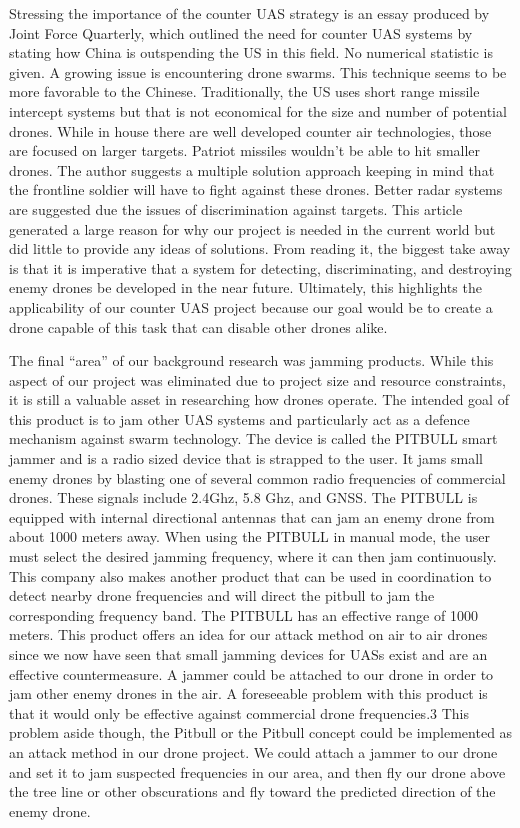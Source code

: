 \documentclass[10pt]{article}
\begin{document}
Stressing the importance of the counter UAS strategy is an essay produced by Joint Force Quarterly, which outlined the need for counter UAS systems by stating how China is outspending the US in this field. No numerical statistic is given. A growing issue is encountering drone swarms. This technique seems to be more favorable to the Chinese. Traditionally, the US  uses short range missile intercept systems but that is not economical for the size and number of potential drones. While in house there are well developed counter air technologies, those are focused on larger targets. Patriot missiles wouldn’t be able to hit smaller drones. The author suggests a multiple solution approach keeping in mind that the frontline soldier will have to fight against these drones. Better radar systems are suggested due the issues of discrimination against targets. This article generated a large reason for why our project is needed in the current world but did little to provide any ideas of solutions. From reading it, the biggest take away is that it is imperative that a system for detecting, discriminating, and destroying enemy drones be developed in the near future.  Ultimately, this highlights the applicability  of our counter UAS project because our goal would be to create a drone capable of this task that can disable other drones alike.  

The final ``area'' of our background research was jamming products. While this aspect of our project was eliminated due to project size and resource constraints, it is still a valuable asset in researching how drones operate.  The intended goal of this product is to jam other UAS systems and particularly act as a defence mechanism against swarm technology.  The device is called the PITBULL smart jammer and is a radio sized device that is strapped to the user.  It jams small enemy drones by blasting one of several common radio frequencies of commercial drones.  These signals include 2.4Ghz, 5.8 Ghz, and GNSS.  The PITBULL is equipped with internal directional antennas that can jam an enemy drone from about 1000 meters away.  When using the PITBULL in manual mode, the user must select the desired jamming frequency, where it can then jam continuously.  This company also makes another product that can be used in coordination to detect nearby drone frequencies and will direct the pitbull to jam the corresponding frequency band.  The PITBULL has an effective range of 1000 meters.  This product offers  an idea for our attack method on air to air drones since we now have seen that small jamming devices for UASs exist and are an effective countermeasure.  A jammer could be attached to our drone in order to jam other enemy drones in the air.  A foreseeable problem with this product is that it would only be effective against commercial drone frequencies.3  This problem aside though, the Pitbull or the Pitbull concept could be implemented as an attack method in our drone project.  We could attach a jammer to our drone and set it to jam suspected frequencies in our area, and then fly our drone above the tree line or other obscurations and fly toward the predicted direction of the enemy drone.  
\end{document}
